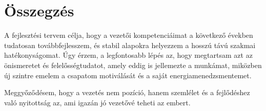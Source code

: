 \section{Összegzés}

A fejlesztési tervem célja, hogy a vezetői kompetenciáimat a következő években tudatosan továbbfejlesszem, 
és stabil alapokra helyezzem a hosszú távú szakmai hatékonyságomat.
Úgy érzem, a legfontosabb lépés az, hogy megtartsam azt az önismeretet és felelősségtudatot, 
amely eddig is jellemezte a munkámat, miközben új szintre emelem a csapatom motiválását és a saját energiamenedzsmentemet.

Meggyőződésem, hogy a vezetés nem pozíció, hanem szemlélet és a fejlődéshez való nyitottság az, 
ami igazán jó vezetővé teheti az embert.

